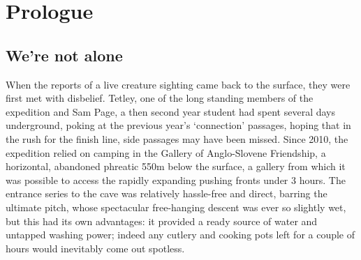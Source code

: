 \chapter{Prologue}



\section{We’re not alone}

When the reports of a live creature sighting came back to the surface, they were first met with disbelief. Tetley, one of the long standing members of the expedition and Sam Page, a then second year student had spent several days underground, poking at the previous year’s ‘connection’ passages, hoping that in the rush for the finish line, side passages may have been missed. Since 2010, the expedition relied on camping in the Gallery of Anglo-Slovene Friendship, a horizontal, abandoned phreatic 550m below the surface, a gallery from which it was possible to access the rapidly expanding pushing fronts under 3 hours. The entrance series to the cave was relatively hassle-free and direct, barring the ultimate pitch, whose spectacular free-hanging descent was ever so slightly wet, but this had its own advantages: it provided a ready source of water and untapped washing power; indeed any cutlery and cooking pots left for a couple of hours would inevitably come out spotless.

